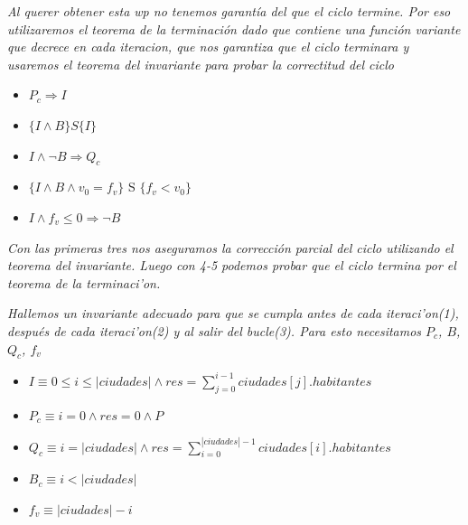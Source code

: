 \documentclass[10pt,a4paper]{article}
\begin{document}
\begin{demoPc}
	\[\]\textsl{Al querer obtener esta wp no tenemos garantía del que el ciclo termine. Por eso utilizaremos el teorema de la terminación dado que contiene una función variante que decrece en cada iteracion, que nos garantiza que el ciclo terminara y usaremos el teorema del invariante para probar la correctitud del ciclo }
	


\begin{itemize}
	
	\item $P_c \Rightarrow I$
	\item $ \{I \land B \} S \{ I \}$
	\item $I \land \neg B \Rightarrow Q_c$
	\item $ \{I \land B \land v_{0}=f_{v} \}$ S $\{f_{v} < v_{0}\}$
	\item $I \land f_{v} \leq 0 \Rightarrow \neg B$
\end{itemize}

\noindent
\textsl{Con las primeras tres nos aseguramos la corrección parcial del ciclo utilizando el teorema del invariante. Luego con 4-5 podemos probar que el ciclo termina por el teorema de la terminaci'on.}

\noindent
\textsl{Hallemos un invariante adecuado para que se cumpla antes de cada iteraci'on(1),
después de cada iteraci'on(2) y al salir del bucle(3). Para esto necesitamos $P_c$, $B$, $Q_c$, $f_{v}$}\\

\par	
\begin{itemize}
	
	\item $I \equiv 0 \leq i \leq |ciudades| \land res= \sum_{j=0}^{i-1} ciudades[j].habitantes$
	\item $P_{c} \equiv i =0 \land res=0 \land P$
	\item $Q_{c}\equiv i=\lvert ciudades\rvert \land  res= \sum_{i=0}^{|ciudades|-1} ciudades[i].habitantes$ 
	\item $B_{c} \equiv i < \lvert ciudades \rvert$
	\item $f_{v} \equiv \lvert ciudades \rvert - i$
	\nonumber
	
\end{itemize}

\newtheorem*{demo1}{Demostración $P_{c} \Rightarrow I$}
\newtheorem*{demo2}{Demostración $ \{I \land B \} S \{ I \}${\newline}}
\newtheorem*{demo3}{Demostración $I \land \neg B \Rightarrow Q_c$}
\newtheorem*{demo4}{Demostración $(I \land v_{0}=f_{v}) S (f_{v} < v_{0})${\newline}}
\newtheorem*{demo5}{Demostración $I \land f_{v} \leq 0 \Rightarrow \neg B$}


\end{demoPc}
\end{document}
